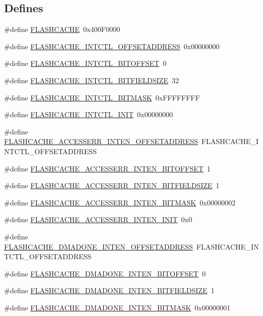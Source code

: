 \subsection*{Defines}
\begin{DoxyCompactItemize}
\item 
\#define \hyperlink{a00550_a3db39f2a48f75415f90413a337967d5c}{FLASHCACHE}~0x400F0000
\item 
\#define \hyperlink{a00550_a5dae3ec1e0308db1d8fad3153c2a6292}{FLASHCACHE\_\-INTCTL\_\-OFFSETADDRESS}~0x00000000
\item 
\#define \hyperlink{a00550_afb2e8c85633290840e0854b1dad1fd22}{FLASHCACHE\_\-INTCTL\_\-BITOFFSET}~0
\item 
\#define \hyperlink{a00550_ac22066c9a9802e685e802eea5e83111b}{FLASHCACHE\_\-INTCTL\_\-BITFIELDSIZE}~32
\item 
\#define \hyperlink{a00550_a0ff3fd185277daa389f61a0df4d91218}{FLASHCACHE\_\-INTCTL\_\-BITMASK}~0xFFFFFFFF
\item 
\#define \hyperlink{a00550_a1d4e5dcec34597ea00482909ba190eb8}{FLASHCACHE\_\-INTCTL\_\-INIT}~0x00000000
\item 
\#define \hyperlink{a00550_af0426558e23d609b86312edd480cefb1}{FLASHCACHE\_\-ACCESSERR\_\-INTEN\_\-OFFSETADDRESS}~FLASHCACHE\_\-INTCTL\_\-OFFSETADDRESS
\item 
\#define \hyperlink{a00550_a7f84a41fa607bb15487789a442a0200d}{FLASHCACHE\_\-ACCESSERR\_\-INTEN\_\-BITOFFSET}~1
\item 
\#define \hyperlink{a00550_a9569efd7d8f4c6f84fc21577a86b2330}{FLASHCACHE\_\-ACCESSERR\_\-INTEN\_\-BITFIELDSIZE}~1
\item 
\#define \hyperlink{a00550_a1d189e9f3136f6135ead322477bd8e26}{FLASHCACHE\_\-ACCESSERR\_\-INTEN\_\-BITMASK}~0x00000002
\item 
\#define \hyperlink{a00550_a52a962cf9a2a95e1364c9e1cfef65ca4}{FLASHCACHE\_\-ACCESSERR\_\-INTEN\_\-INIT}~0x0
\item 
\#define \hyperlink{a00550_a2432b29919b752a5f63437b302bf80a6}{FLASHCACHE\_\-DMADONE\_\-INTEN\_\-OFFSETADDRESS}~FLASHCACHE\_\-INTCTL\_\-OFFSETADDRESS
\item 
\#define \hyperlink{a00550_a60b9027b4f7a996cde43cc341c36645e}{FLASHCACHE\_\-DMADONE\_\-INTEN\_\-BITOFFSET}~0
\item 
\#define \hyperlink{a00550_a0398f9dbae07d99eb46bfd5a363e1761}{FLASHCACHE\_\-DMADONE\_\-INTEN\_\-BITFIELDSIZE}~1
\item 
\#define \hyperlink{a00550_ac24d2680e65acdb6a75eb78ba226c86f}{FLASHCACHE\_\-DMADONE\_\-INTEN\_\-BITMASK}~0x00000001

\end{DoxyCompactItemize}
